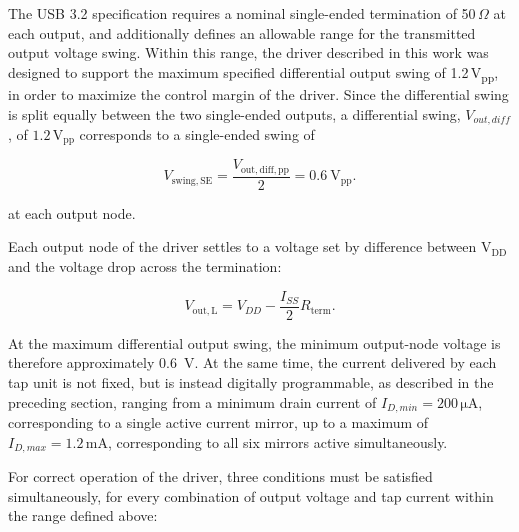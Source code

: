 The \ac{USB} 3.2 specification requires a nominal single-ended termination of 50\,$\Omega$ at each output, and additionally defines an allowable range for the transmitted output voltage swing. Within this range, the driver described in this work was designed to support the maximum specified differential output swing of 1.2\,V\textsubscript{pp}, in order to maximize the control margin of the driver. Since the differential swing is split equally between the two single-ended outputs, a differential swing, $V_{out,diff}$, of $\mathrm{1.2\,V_{pp}}$ corresponds to a single-ended swing of

\begin{equation}
V_{\mathrm{swing,SE}} = \frac{V_{\mathrm{out,diff,pp}}}{2} = 0.6~\mathrm{V_{pp}}.
\label{eq:vo_se}
\end{equation}

at each output node.


Each output node of the driver settles to a voltage set by difference between $\mathrm{V_{DD}}$ and the voltage drop across the termination:

\begin{equation}
V_{\mathrm{out,L}} = V_{DD} - \frac{I_{SS}}{2}R_{\mathrm{term}}.
\end{equation}

At the maximum differential output swing, the minimum output-node voltage is therefore approximately 0.6~V. At the same time, the current delivered by each tap unit is not fixed, but is instead digitally programmable, as described in the preceding section, ranging from a minimum drain current of $I_{D,min} = 200\,\mathrm{\mu A}$, corresponding to a single active current mirror, up to a maximum of $I_{D,max} = 1.2\,\mathrm{mA}$, corresponding to all six mirrors active simultaneously.

For correct operation of the driver, three conditions must be satisfied simultaneously, for every combination of output voltage and tap current within the range defined above:

